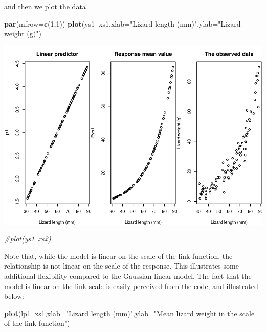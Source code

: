 \documentclass[
]{book}
\newenvironment{Shaded}{\begin{snugshade}}{\end{snugshade}}
\newcommand{\CommentTok}[1]{\textcolor[rgb]{0.56,0.35,0.01}{\textit{#1}}}
\newcommand{\DataTypeTok}[1]{\textcolor[rgb]{0.13,0.29,0.53}{#1}}
\newcommand{\DecValTok}[1]{\textcolor[rgb]{0.00,0.00,0.81}{#1}}
\newcommand{\KeywordTok}[1]{\textcolor[rgb]{0.13,0.29,0.53}{\textbf{#1}}}
\newcommand{\NormalTok}[1]{#1}
\newcommand{\OperatorTok}[1]{\textcolor[rgb]{0.81,0.36,0.00}{\textbf{#1}}}
\newcommand{\StringTok}[1]{\textcolor[rgb]{0.31,0.60,0.02}{#1}}
\begin{document}
and then we plot the data

\begin{Shaded}
\begin{Highlighting}[]
\KeywordTok{par}\NormalTok{(}\DataTypeTok{mfrow=}\KeywordTok{c}\NormalTok{(}\DecValTok{1}\NormalTok{,}\DecValTok{1}\NormalTok{))}
\KeywordTok{plot}\NormalTok{(ys1}\OperatorTok{~}\NormalTok{xs1,}\DataTypeTok{xlab=}\StringTok{"Lizard length (mm)"}\NormalTok{,}\DataTypeTok{ylab=}\StringTok{"Lizard weight (g)"}\NormalTok{)}
\end{Highlighting}
\end{Shaded}

\includegraphics{ECOMODbook_files/figure-latex/glm2-1.pdf}

\begin{Shaded}
\begin{Highlighting}[]
\CommentTok{#plot(ys1~xs2)}
\end{Highlighting}
\end{Shaded}

Note that, while the model is linear on the scale of the link function, the relationship is not linear on the scale of the response. This illustrates some additional flexibility compared to the Gaussian linear model. The fact that the model is linear on the link scale is easily perceived from the code, and illustrated below:

\begin{Shaded}
\begin{Highlighting}[]
\KeywordTok{plot}\NormalTok{(lp1}\OperatorTok{~}\NormalTok{xs1,}\DataTypeTok{xlab=}\StringTok{"Lizard length (mm)"}\NormalTok{,}\DataTypeTok{ylab=}\StringTok{"Mean lizard weight in the scale of the link function"}\NormalTok{)}
\end{Highlighting}
\end{Shaded}
\end{document}
